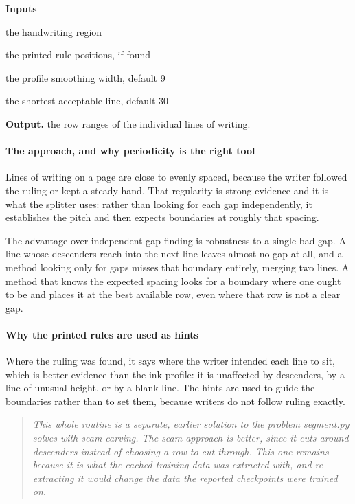 \noindent\textbf{Inputs}
\begin{description}[leftmargin=2.2em,style=nextline,font=\normalfont\ttfamily]\setlength\itemsep{1pt}
  \item[{binaryRegion}] \normalfont the handwriting region
  \item[{ruleLineHints}] \normalfont the printed rule positions, if found
  \item[{smoothWindow}] \normalfont the profile smoothing width, default 9
  \item[{minLineHeight}] \normalfont the shortest acceptable line, default 30
\end{description}

\noindent\textbf{Output.} the row ranges of the individual lines of writing.


\paragraph{The approach, and why periodicity is the right tool}
Lines of writing on a page are close to evenly spaced, because the writer followed the ruling or kept a steady hand. That regularity is strong evidence and it is what the splitter uses: rather than looking for each gap independently, it establishes the pitch and then expects boundaries at roughly that spacing.

The advantage over independent gap-finding is robustness to a single bad gap. A line whose descenders reach into the next line leaves almost no gap at all, and a method looking only for gaps misses that boundary entirely, merging two lines. A method that knows the expected spacing looks for a boundary where one ought to be and places it at the best available row, even where that row is not a clear gap.


\paragraph{Why the printed rules are used as hints}
Where the ruling was found, it says where the writer intended each line to sit, which is better evidence than the ink profile: it is unaffected by descenders, by a line of unusual height, or by a blank line. The hints are used to guide the boundaries rather than to set them, because writers do not follow ruling exactly.


\begin{quote}\small\itshape This whole routine is a separate, earlier solution to the problem segment.py solves with seam carving. The seam approach is better, since it cuts around descenders instead of choosing a row to cut through. This one remains because it is what the cached training data was extracted with, and re-extracting it would change the data the reported checkpoints were trained on.\end{quote}

